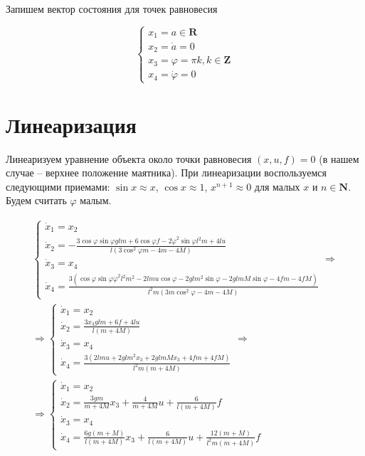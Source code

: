 Запишем вектор состояния для точек равновесия

\begin{equation}
    \begin{cases}
        x_1 = a \in \mathbf{R}\\
        x_2 = \dot{a} = 0\\
        x_3 = \varphi = \pi k, k \in \mathbf{Z} \\
        x_4 = \dot{\varphi} = 0
    \end{cases}
\end{equation}

\section{Линеаризация}

Линеаризуем уравнение объекта около точки равновесия $(x,u,f) = 0$ (в нашем случае -- верхнее положение маятника). При линеаризации воспользуемся следующими приемами: $\sin x \approx x$, $\cos x \approx 1$, $x^{n+1} \approx 0$ для малых $x$ и $n \in \mathbf{N}$. Будем считать $\varphi$ малым.

\begin{multline}
    \begin{cases}
        \dot{x}_1 = x_2\\
        \dot{x}_2 = - \frac{3 \cos{\varphi} \sin {\varphi} g lm + 6 \cos{\varphi}f-2 \dot{\varphi}^2\sin{\varphi}l^2m+4lu}{l(3 \cos^2 \varphi m - 4m -4M)}\\
        \dot{x}_3 = x_4\\
        \dot{x}_4  = \frac{3(\cos \varphi \sin \varphi \dot{\varphi}^2l^2m^2-2lmu \cos{\varphi}-2glm^2 \sin{\varphi} - 2 glmM \sin{\varphi} - 4fm - 4fM)}{l^2m(3m \cos^2 \varphi -4m-4M)}
    \end{cases} \Rightarrow\\
    \Rightarrow
    \begin{cases}
        \dot{x}_1 = x_2\\
        \dot{x}_2 =  \frac{3  x_3 g lm + 6 f+4lu}{l(m +4M)}\\
        \dot{x}_3 = x_4\\
        \dot{x}_4  = \frac{3( 2lmu +2glm^2 x_3 + 2 glmM x_3 + 4fm + 4fM)}{l^2m(m+4M)}
    \end{cases}  \Rightarrow\\
    \Rightarrow
    \begin{cases}
        \dot{x}_1 = x_2\\
        \dot{x}_2 =  \frac{3   g m}{m +4M}x_3 + \frac{4}{m +4M}u + \frac{6 }{l(m +4M)}f\\
        \dot{x}_3 = x_4\\
        \dot{x}_4  = \frac{6g( m  +  M  )}{l(m+4M)}x_3 + \frac{6  }{l(m+4M)}u + \frac{12(  m + M)}{l^2m(m+4M)}f
    \end{cases} 
\end{multline}

